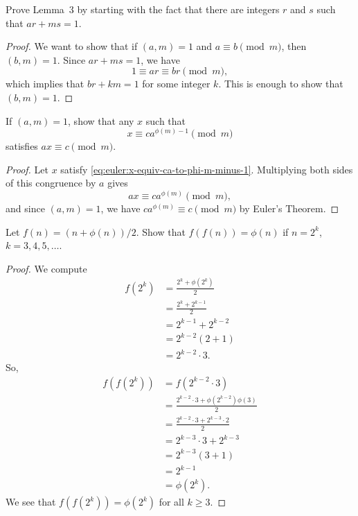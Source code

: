  Prove Lemma~3 by starting with the fact that there are
integers $r$ and $s$ such that $ar + ms = 1$.
\begin{proof}
  We want to show that if $(a,m) = 1$ and $a\equiv b\pmod{m}$, then
  $(b,m) = 1$. Since $ar + ms = 1$, we have
  \begin{equation*}
    1 \equiv ar \equiv br \pmod{m},
  \end{equation*}
  which implies that $br + km = 1$ for some integer $k$. This is
  enough to show that $(b,m) = 1$.
\end{proof}

 If $(a,m) = 1$, show that any $x$ such that
\begin{equation}
  \label{eq:euler:x-equiv-ca-to-phi-m-minus-1}
  x\equiv ca^{\phi(m)-1}\pmod{m}
\end{equation}
satisfies $ax\equiv c\pmod{m}$.
\begin{proof}
  Let $x$ satisfy
  \eqref{eq:euler:x-equiv-ca-to-phi-m-minus-1}. Multiplying both sides
  of this congruence by $a$ gives
  \begin{equation*}
    ax \equiv ca^{\phi(m)}\pmod{m},
  \end{equation*}
  and since $(a,m) = 1$, we have $ca^{\phi(m)}\equiv c\pmod{m}$ by
  Euler's Theorem.
\end{proof}

 Let $f(n) = (n + \phi(n))/2$. Show that
$f(f(n)) = \phi(n)$ if $n = 2^k$, $k = 3, 4, 5, \dots$.
\begin{proof}
  We compute
  \begin{align*}
    f(2^k) &= \frac{2^k + \phi(2^k)}2 \\
           &= \frac{2^k + 2^{k-1}}2 \\
           &= 2^{k-1} + 2^{k-2} \\
           &= 2^{k-2}(2 + 1) \\
           &= 2^{k-2}\cdot3.
  \end{align*}
  So,
  \begin{align*}
    f(f(2^k)) &= f(2^{k-2}\cdot3) \\
              &= \frac{2^{k-2}\cdot3 + \phi(2^{k-2})\phi(3)}2 \\
              &= \frac{2^{k-2}\cdot3 + 2^{k-3}\cdot2}2 \\
              &= 2^{k-3}\cdot3 + 2^{k-3} \\
              &= 2^{k-3}(3 + 1) \\
              &= 2^{k-1} \\
              &= \phi(2^k).
  \end{align*}
  We see that $f(f(2^k)) = \phi(2^k)$ for all $k\geq3$.
\end{proof}

